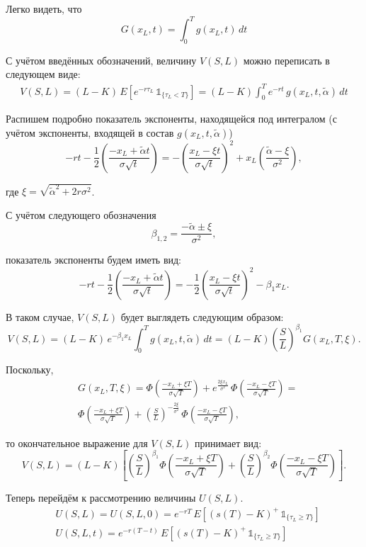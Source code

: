 \documentclass[oneside,final,12pt]{article}
\begin{document}
Легко видеть, что 
$$
G(x_L,t) = \int_0^T g(x_L,t) \, dt
$$

С учётом введённых обозначений, величину $V(S,L)$ можно переписать в следующем виде:
\begin{align*}
    V(S,L) = (L-K) \, E[e^{-r\tau_L} \, \mathbb{1}_{\{\tau_L < T\}}] =
    (L-K) \int_0^T e^{-rt} \, g(x_L,t,\widetilde{\alpha}) \, dt
\end{align*}

Распишем подробно показатель экспоненты, находящейся под интегралом (с учётом экспоненты, входящей в состав $g(x_L,t,\widetilde{\alpha})$)
$$
    - rt - \frac{1}{2} \left( \frac{-x_L+\widetilde{\alpha}t}{\sigma \sqrt{t}}\right) =
    -\left( \frac{x_L-\xi t}{\sigma \sqrt{t}}\right)^2 + 
    x_L \left( \frac{\widetilde{\alpha}-\xi}{\sigma^2}\right),
$$

\noindent
где $\xi = \sqrt{\widetilde{\alpha}^2 + 2r\sigma^2}$.

С учётом следующего обозначения
$$
\beta_{1,2} = \frac{-\widetilde{\alpha}\pm\xi}{\sigma^2},
$$

\noindent
показатель экспоненты будем иметь вид:
$$
- rt - \frac{1}{2} \left( \frac{-x_L+\widetilde{\alpha}t}{\sigma \sqrt{t}}\right) = -\frac{1}{2}\left( \frac{x_L-\xi t}{\sigma \sqrt{t}}\right)^2 - \beta_1 x_L.
$$

В таком случае, $V(S,L)$ будет выглядеть следующим образом:
$$
V(S,L) = (L-K) \, e^{-\beta_1 x_L}\int_0^T g(x_L,t,\widetilde{\alpha}) \, dt =
(L-K) \left( \frac{S}{L} \right)^{\beta_1} G(x_L,T,\xi).
$$

Поскольку,
\begin{align*}
& G(x_L,T,\xi) = \Phi\left( \frac{-x_L+\xi T}{\sigma \sqrt{T}} \right) + 
e^{\frac{2\xi x_L}{\sigma^2}} \, \Phi\left( \frac{-x_L-\xi T}{\sigma \sqrt{T}} \right) = \\
& \Phi\left( \frac{-x_L+\xi T}{\sigma \sqrt{T}} \right) + 
\left( \frac{S}{L} \right)^{-\frac{2\xi}{\sigma^2}} \, \Phi\left( \frac{-x_L-\xi T}{\sigma \sqrt{T}} \right),
\end{align*}

\noindent
то окончательное выражение для $V(S,L)$ принимает вид:
$$
V(S,L) = (L-K) \left[ \left(\frac{S}{L} \right)^{\beta_1} \Phi\left( \frac{-x_L+\xi T}{\sigma \sqrt{T}} \right) + \left(\frac{S}{L} \right)^{\beta_2} \Phi\left( \frac{-x_L-\xi T}{\sigma \sqrt{T}} \right) \right].
$$

Теперь перейдём к рассмотрению величины $U(S,L)$.
\begin{align*}
& U(S,L)=U(S,L,0)=e^{-rT} \, E[(s(T)-K)^+ \, \mathbb{1}_{\{\tau_L \geq T\}}] \\
& U(S,L,t)=e^{-r(T-t)} \, E[(s(T)-K)^+ \, \mathbb{1}_{\{\tau_L \geq T\}}]
\end{align*}
\end{document}
